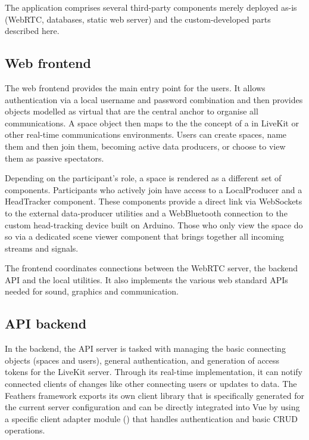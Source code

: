 The application comprises several third-party components merely deployed as-is (WebRTC, databases, static web server) and the custom-developed parts described here.

\subsection{Web frontend}

The web frontend provides the main entry point for the users. It allows authentication via a local username and password combination and then provides objects modelled as virtual  that are the central anchor to organise all communications. A space object then maps to the the concept of a  in LiveKit or other real-time communications environments. Users can create spaces, name them and then join them, becoming active data producers, or choose to view them as passive spectators.

Depending on the participant's role, a space is rendered as a different set of components. Participants who actively join have access to a LocalProducer and a HeadTracker component. These components provide a direct link via WebSockets to the external data-producer utilities and a WebBluetooth connection to the custom head-tracking device built on Arduino. Those who only view the space do so via a dedicated scene viewer component that brings together all incoming streams and signals.

The frontend coordinates connections between the WebRTC server, the backend \ac{API} and the local utilities. It also implements the various web standard \ac{API}s needed for sound, graphics and communication.

\subsection{API backend}

In the backend, the \ac{API} server is tasked with managing the basic connecting objects (spaces and users), general authentication, and generation of access tokens for the LiveKit server. Through its real-time implementation, it can notify connected clients of changes like other connecting users or updates to data. The Feathers framework exports its own client library that is specifically generated for the current server configuration and can be directly integrated into Vue by using a specific client adapter module () that handles authentication and basic \ac{CRUD} operations.

